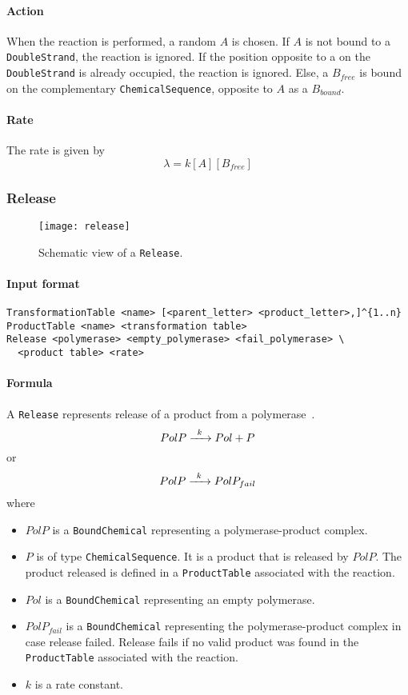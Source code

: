\paragraph{Action}
When the reaction is performed, a random $A$ is chosen.
If $A$ is not bound to a \texttt{DoubleStrand}, the reaction is ignored.
If the position opposite to a on the \texttt{DoubleStrand} is already occupied,
the reaction is ignored.
Else, a $B_{free}$ is bound on the complementary \texttt{ChemicalSequence},
opposite to $A$ as a $B_{bound}$.

\paragraph{Rate}
The rate is given by
\[
\lambda = k[A][B_{free}]
\]


\subsubsection{Release}

\begin{figure}[!h]
  \centering
  \texttt{[image: release]}
  \caption{Schematic view of a \texttt{Release}.}
\label{fig:release}
\end{figure}

\paragraph{Input format}
\begin{verbatim}
TransformationTable <name> [<parent_letter> <product_letter>,]^{1..n}
ProductTable <name> <transformation table>
Release <polymerase> <empty_polymerase> <fail_polymerase> \
  <product table> <rate>
\end{verbatim}

\paragraph{Formula}
A \texttt{Release} represents release of a product from a polymerase~.
\[
	\reactionIrr{PolP}{Pol + P}{k}{}
\]
or
\[
	\reactionIrr{PolP}{PolP_{fail}}{k}{}
\]
where
\begin{itemize}
	\item $PolP$ is a \texttt{BoundChemical} representing a polymerase-product complex.
	\item $P$ is of type \texttt{ChemicalSequence}.
  It is a product that is released by $PolP$.
  The product released is defined in a \texttt{ProductTable} associated with the reaction.
	\item $Pol$ is a \texttt{BoundChemical} representing an empty polymerase.
	\item $PolP_{fail}$ is a \texttt{BoundChemical} representing the polymerase-product complex
  in case release failed.
  Release fails if no valid product was found in the
  \texttt{ProductTable} associated with the reaction.
	\item $k$ is a rate constant.
\end{itemize}

